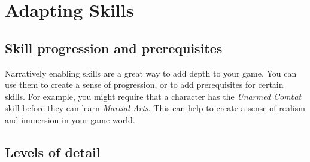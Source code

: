 \section{Adapting Skills}\label{toolbox:sec:adapting-skills}

\subsection{Skill progression and prerequisites}\label{toolbox:skill-progress}

Narratively enabling skills\label{toolbox:narrative-skills} are a great way to add depth to your game. You can use them to create a sense of progression, or to add prerequisites for certain skills. For example, you might require that a character has the \textit{Unarmed Combat} skill before they can learn \textit{Martial Arts}. This can help to create a sense of realism and immersion in your game world.


\subsection{Levels of detail}\label{toolbox:detailed-skill-lists}